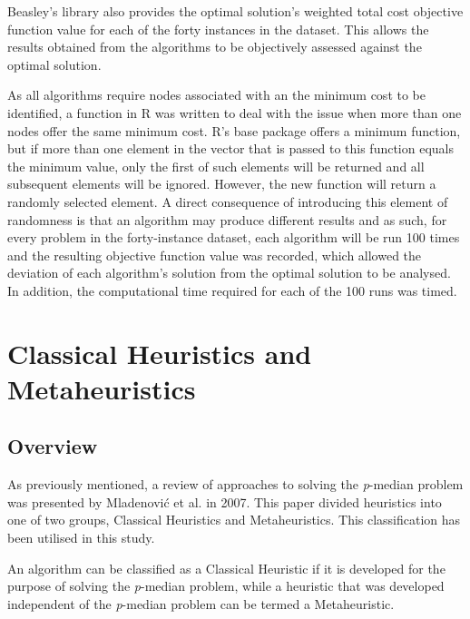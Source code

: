 \documentclass[11pt]{article}
\begin{document}
	Beasley's library also provides the optimal solution's weighted total cost objective function value for each of the forty instances in the dataset.  This allows the results obtained from the algorithms to be objectively assessed against the optimal solution.  
	
	As all algorithms require nodes associated with an the minimum cost to be identified, a function in R  was written to deal with the issue when more than one nodes offer the same minimum cost.  R's base package offers a minimum function, but if more than one element in the vector that is passed to this function equals the minimum value, only the first of such elements will be returned and all subsequent elements will be ignored.  However, the new function will return a randomly selected element.  A direct consequence of introducing this element of randomness is that an algorithm may produce different results and as such, for every problem in the forty-instance dataset, each algorithm will be run 100 times and the resulting objective function value was recorded, which allowed the deviation of each algorithm's solution from the optimal solution to be analysed.  In addition, the computational time required for each of the 100 runs was timed.
	
		
	\section{Classical Heuristics and Metaheuristics} \label{classical.meta.heuristics}
	\subsection{Overview} \label{heuristics.overview}
	As previously mentioned, a review of approaches to solving the \textit{p}-median problem was presented by Mladenovi\'{c} et al. \cite{MLAD07} in 2007.  This paper divided heuristics into one of two groups, Classical Heuristics and Metaheuristics.  This classification has been utilised in this study.
	
	An algorithm can be classified as a Classical Heuristic if it is developed for the purpose of solving the \emph{p}-median problem, while a heuristic that was developed independent of the \emph{p}-median problem can be termed a Metaheuristic.
		
	
\end{document}
